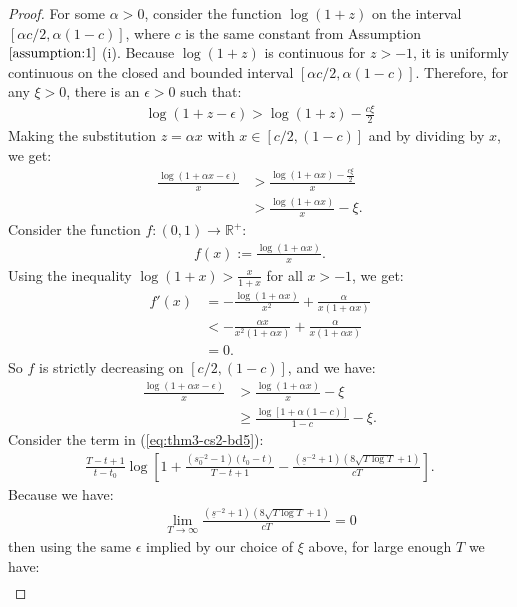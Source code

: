 \documentclass{article}
\begin{document}
\begin{proof}
For some $\alpha > 0$, consider the function $\log(1 + z)$ on the interval $[\alpha c/2, \alpha (1-c)]$, where $c$ is the same constant from Assumption $\ref{assumption:1}$ (i). Because $\log(1 + z)$ is continuous for $z > -1$, it is uniformly continuous on the closed and bounded interval $[\alpha c/2, \alpha (1-c)]$. Therefore, for any $\xi > 0$, there is an $\epsilon > 0$ such that:
\begin{align*}
     \log(1 + z - \epsilon) > \log(1 + z) - \frac{c \xi}{2}
\end{align*}
Making the substitution $z = \alpha x$ with $x \in [c/2, (1-c)]$ and by dividing by $x$, we get:
\begin{align*}
     \frac{\log(1 + \alpha x - \epsilon)}{x} &> \frac{\log(1 + \alpha x) - \frac{c \xi}{2}}{x} \\
     &> \frac{\log(1 + \alpha x)}{x} - \xi. \tag{$x \geq c/2$}
\end{align*}
Consider the function $f: (0,1) \to \mathbb{R}^+$:
\begin{align*}
    f(x) := \frac{\log(1 + \alpha x)}{x}.
\end{align*}
Using the inequality $\log(1+x) > \frac{x}{1+x}$ for all $x > - 1$, we get:
\begin{align*}
    f'(x) &= -\frac{\log(1 + \alpha x)}{x^2} + \frac{\alpha}{x(1 + \alpha x)} \\
    &< -\frac{\alpha x }{x^2(1+\alpha x)} + \frac{\alpha}{x(1 + \alpha x)} \\
    &= 0.
\end{align*}
So $f$ is strictly decreasing on $[c/2, (1-c)]$, and we have:
\begin{align*}
     \frac{\log(1 + \alpha x - \epsilon)}{x} &> \frac{\log(1 + \alpha x)}{x} - \xi \\
     &\geq \frac{\log[1 + \alpha (1-c)]}{1-c} - \xi.
\end{align*}
Consider the term in (\ref{eq:thm3-cs2-bd5}): 
\begin{align*}
     \frac{T-t+1}{t-t_0}\log\left[1 + \frac{\left(s_0^{-2} -1\right)(t_0 - t)}{T - t + 1} -  \frac{(\underline{s}^{-2} + 1)\left(8\sqrt{T\log T} +1\right)}{cT}\right].
\end{align*}
Because we have:
\begin{align*}
    \lim_{T \to \infty}  \frac{(\underline{s}^{-2} + 1)\left(8\sqrt{T\log T} +1\right)}{cT} = 0
\end{align*}
then using the same $\epsilon$ implied by our choice of $\xi$ above, for large enough $T$ we have:
\begin{align*}

\end{align*}
\end{proof}
\end{document}
